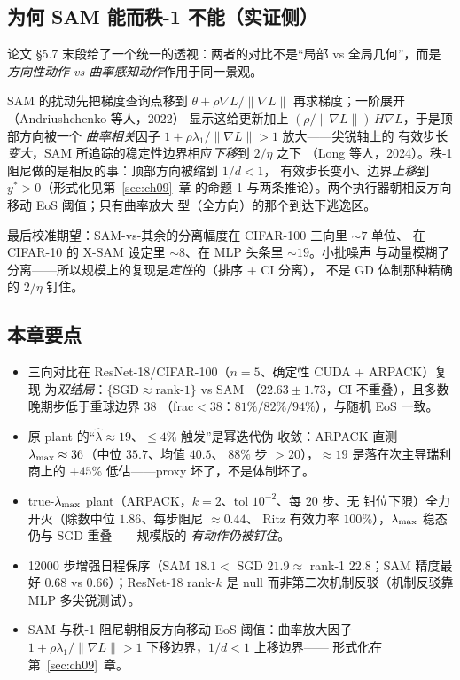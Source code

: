 \subsection{为何 SAM 能而秩-1 不能（实证侧）}\label{sec:ch08-why}

论文 \S5.7 末段给了一个统一的透视：两者的对比不是“局部 vs 全局几何”，而是
\emph{方向性动作 vs 曲率感知动作}作用于同一景观。

SAM 的扰动先把梯度查询点移到
$\theta+\rho\nabla L/\|\nabla L\|$ 再求梯度；一阶展开（Andriushchenko 等人，2022）
显示这给更新加上 $(\rho/\|\nabla L\|)\,H\nabla L$，于是顶部方向被一个
\emph{曲率相关}因子 $1+\rho\lambda_{1}/\|\nabla L\|>1$ 放大——尖锐轴上的
有效步长\emph{变大}，SAM 所追踪的稳定性边界相应\emph{下移}到 $2/\eta$ 之下
（Long 等人，2024）。秩-1 阻尼做的是相反的事：顶部方向被缩到 $1/d<1$，
有效步长变小、边界\emph{上移}到 $y^{*}>0$（形式化见第~\ref{sec:ch09}~章
的命题 1 与两条推论）。两个执行器朝相反方向移动 EoS 阈值；只有曲率放大
型（全方向）的那个到达下逃逸区。

最后校准期望：SAM-vs-其余的分离幅度在 CIFAR-100 三向里 ${\sim}7$ 单位、
在 CIFAR-10 的 X-SAM 设定里 ${\sim}8$、在 MLP 头条里 ${\sim}19$。小批噪声
与动量模糊了分离——所以规模上的复现是\emph{定性}的（排序 + CI 分离），
不是 GD 体制那种精确的 $2/\eta$ 钉住。

\subsection*{本章要点}
\begin{itemize}
  \item 三向对比在 ResNet-18/CIFAR-100（$n=5$、确定性 CUDA + ARPACK）复现
        为\emph{双结局}：$\{\text{SGD}\approx\text{rank-1}\}$ vs SAM
        （$22.63\pm1.73$，CI 不重叠），且多数晚期步低于重球边界 38
        （frac${}<38$：$81\%/82\%/94\%$），与随机 EoS 一致。
  \item 原 plant 的“$\hat\lambda\approx19$、$\le4\%$ 触发”是幂迭代伪
        收敛：ARPACK 直测 $\lambda_{\max}\approx36$（中位 $35.7$、均值 $40.5$、
        $88\%$ 步 $>20$），$\approx19$ 是落在次主导瑞利商上的 $+45\%$
        低估——proxy 坏了，不是体制坏了。
  \item true-$\lambda_{\max}$ plant（ARPACK，$k=2$、tol $10^{-2}$、每 $20$ 步、无
        钳位下限）全力开火（除数中位 $1.86$、每步阻尼 $\approx0.44$、
        Ritz 有效力率 $100\%$），$\lambda_{\max}$ 稳态仍与 SGD 重叠——规模版的
        \emph{有动作仍被钉住}。
  \item 12000 步增强日程保序（SAM $18.1<$ SGD $21.9\approx$ rank-1
        $22.8$；SAM 精度最好 $0.68$ vs $0.66$）；ResNet-18 rank-$k$ 是
        null 而非第二次机制反驳（机制反驳靠 MLP 多尖锐测试）。
  \item SAM 与秩-1 阻尼朝相反方向移动 EoS 阈值：曲率放大因子
        $1+\rho\lambda_1/\|\nabla L\|>1$ 下移边界，$1/d<1$ 上移边界——
        形式化在第~\ref{sec:ch09}~章。
\end{itemize}
